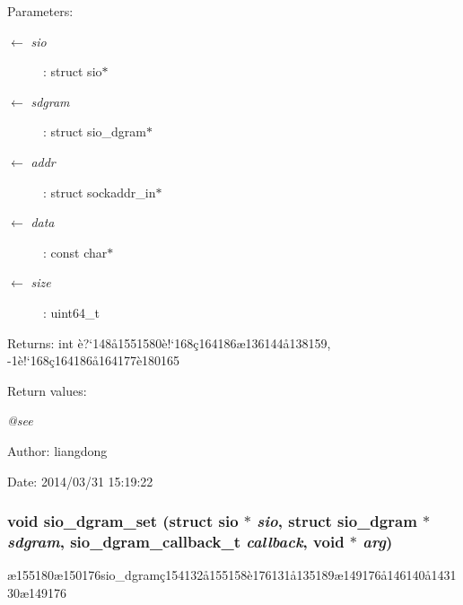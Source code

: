 \begin{Desc}
\item[Parameters:]
\begin{description}
\item[\mbox{$\leftarrow$} {\em sio}]: struct sio$\ast$ \item[\mbox{$\leftarrow$} {\em sdgram}]: struct sio\_\-dgram$\ast$ \item[\mbox{$\leftarrow$} {\em addr}]: struct sockaddr\_\-in$\ast$ \item[\mbox{$\leftarrow$} {\em data}]: const char$\ast$ \item[\mbox{$\leftarrow$} {\em size}]: uint64\_\-t \end{description}
\end{Desc}
\begin{Desc}
\item[Returns:]int \`{e}?`148\aa{}1551580\`{e}!`168\c{c}164186\ae{}136144\aa{}138159, -1\`{e}!`168\c{c}164186\aa{}164177\`{e}180165 \end{Desc}
\begin{Desc}
\item[Return values:]
\begin{description}
\item[{\em @see}]\end{description}
\end{Desc}
\begin{Desc}
\item[Author:]liangdong \end{Desc}
\begin{Desc}
\item[Date:]2014/03/31 15:19:22 \end{Desc}
\subsubsection{\setlength{\rightskip}{0pt plus 5cm}void sio\_\-dgram\_\-set (struct sio $\ast$ {\em sio}, struct sio\_\-dgram $\ast$ {\em sdgram}, sio\_\-dgram\_\-callback\_\-t {\em callback}, void $\ast$ {\em arg})}\label{sio__dgram_8c_a5}


\ae{}155180\ae{}150176sio\_\-dgram\c{c}154132\aa{}155158\`{e}176131\aa{}135189\ae{}149176\aa{}146140\aa{}143130\ae{}149176 

